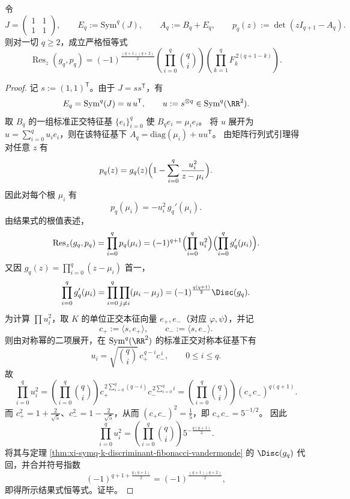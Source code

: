 \begin{theorem}\label{thm:xi-symq-kj-resultant-fibonacci}
令
\[
J=\begin{pmatrix}1&1\\[2pt]1&1\end{pmatrix},
\qquad
E_q:=\mathrm{Sym}^q(J),
\qquad
A_q:=B_q+E_q,
\qquad
p_q(z):=\det(zI_{q+1}-A_q).
\]
则对一切 \(q\ge 2\)，成立严格恒等式
\[
\operatorname{Res}_z(g_q,p_q)
=(-1)^{\frac{(q+1)(q+2)}2}
\left(\prod_{i=0}^{q}\binom{q}{i}\right)
\left(\prod_{k=1}^{q}F_k^{\,2(q+1-k)}\right).
\]
\end{theorem}
\begin{proof}
记 \(s:=(1,1)^{\mathsf T}\)。由于 \(J=ss^{\mathsf T}\)，有
\[
E_q=\mathrm{Sym}^q(J)=u\,u^{\mathsf T},
\qquad
u:=s^{\otimes q}\in\mathrm{Sym}^q(\RR^2).
\]
取 \(B_q\) 的一组标准正交特征基 \(\{e_i\}_{i=0}^{q}\) 使 \(B_q e_i=\mu_i e_i\)。
将 \(u\) 展开为 \(u=\sum_{i=0}^{q}u_i e_i\)，则在该特征基下 \(A_q=\mathrm{diag}(\mu_i)+uu^{\mathsf T}\)。
由矩阵行列式引理得对任意 \(z\) 有
\[
p_q(z)=g_q(z)\Bigl(1-\sum_{i=0}^{q}\frac{u_i^2}{z-\mu_i}\Bigr).
\]
因此对每个根 \(\mu_i\) 有
\[
p_q(\mu_i)=-u_i^2\,g_q'(\mu_i).
\]
由结果式的根值表述，
\[
\operatorname{Res}_z(g_q,p_q)=\prod_{i=0}^{q}p_q(\mu_i)
=(-1)^{q+1}\Bigl(\prod_{i=0}^{q}u_i^2\Bigr)\Bigl(\prod_{i=0}^{q}g_q'(\mu_i)\Bigr).
\]
又因 \(g_q(z)=\prod_{i=0}^{q}(z-\mu_i)\) 首一，
\[
\prod_{i=0}^{q}g_q'(\mu_i)
=\prod_{i=0}^{q}\prod_{j\ne i}(\mu_i-\mu_j)
=(-1)^{\frac{q(q+1)}2}\Disc(g_q).
\]
为计算 \(\prod u_i^2\)，取 \(K\) 的单位正交本征向量 \(e_+,e_-\)（对应 \(\varphi,\psi\)），并记
\[
c_+:=\langle s,e_+\rangle,\qquad c_-:=\langle s,e_-\rangle.
\]
则由对称幂的二项展开，在 \(\mathrm{Sym}^q(\RR^2)\) 的标准正交对称本征基下有
\[
u_i=\sqrt{\binom{q}{i}}\,c_+^{\,q-i}c_-^{\,i},
\qquad 0\le i\le q.
\]
故
\[
\prod_{i=0}^{q}u_i^2
=\left(\prod_{i=0}^{q}\binom{q}{i}\right)
c_+^{\,2\sum_{i=0}^{q}(q-i)}c_-^{\,2\sum_{i=0}^{q}i}
=\left(\prod_{i=0}^{q}\binom{q}{i}\right)(c_+c_-)^{q(q+1)}.
\]
而 \(c_+^2=1+\frac{2}{\sqrt5}\)、\(c_-^2=1-\frac{2}{\sqrt5}\)，从而
\((c_+c_-)^2=\frac15\)，即 \(c_+c_-=5^{-1/2}\)。
因此
\[
\prod_{i=0}^{q}u_i^2
=\left(\prod_{i=0}^{q}\binom{q}{i}\right)5^{-\frac{q(q+1)}2}.
\]
将其与定理 \ref{thm:xi-symq-k-discriminant-fibonacci-vandermonde} 的 \(\Disc(g_q)\) 代回，并合并符号指数
\[
(-1)^{q+1+\frac{q(q+1)}2}=(-1)^{\frac{(q+1)(q+2)}2},
\]
即得所示结果式恒等式。证毕。
\end{proof}

